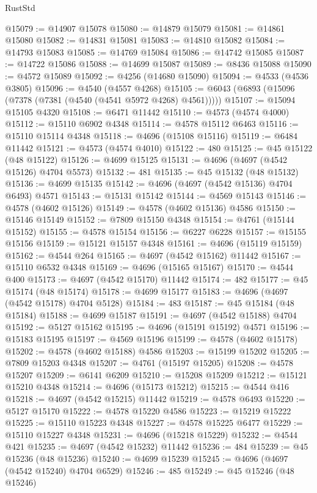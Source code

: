 \begin{lexlean}{RustStd}
\begin{coremodule}
@15079 := @14907 @15078
@15080 := @14879 @15079
@15081 := @14861 @15080
@15082 := @14831 @15081
@15083 := @14810 @15082
@15084 := @14793 @15083
@15085 := @14769 @15084
@15086 := @14742 @15085
@15087 := @14722 @15086
@15088 := @14699 @15087
@15089 := @8436 @15088
@15090 := @4572 @15089
@15092 := @4256 (@14680 @15090)
@15094 := @4533 (@4536 @3805)
@15096 := @4540 (@4557 @4268)
@15105 := @6043 (@6893 (@15096 (@7378 (@7381 (@4540 (@4541 @5972 @4268) @4561)))))
@15107 := @15094 @15105 @4320
@15108 := @6471 @11442
@15110 := @4573 (@4574 @4000)
@15112 := @15110 @6902 @4348
@15114 := @4578 @15112 @6463
@15116 := @15110 @15114 @4348
@15118 := @4696 (@15108 @15116)
@15119 := @6484 @11442
@15121 := @4573 (@4574 @4010)
@15122 := 480
@15125 := @45 @15122 (@48 @15122)
@15126 := @4699 @15125
@15131 := @4696 (@4697 (@4542 @15126) @4704 @5573)
@15132 := 481
@15135 := @45 @15132 (@48 @15132)
@15136 := @4699 @15135
@15142 := @4696 (@4697 (@4542 @15136) @4704 @6493) @4571
@15143 := @15131 @15142
@15144 := @4569 @15143
@15146 := @4578 (@4602 @15126)
@15149 := @4578 (@4602 @15136) @4586
@15150 := @15146 @15149
@15152 := @7809 @15150 @4348
@15154 := @4761 (@15144 @15152)
@15155 := @4578 @15154
@15156 := @6227 @6228
@15157 := @15155 @15156
@15159 := @15121 @15157 @4348
@15161 := @4696 (@15119 @15159)
@15162 := @4544 @264
@15165 := @4697 (@4542 @15162) @11442
@15167 := @15110 @6532 @4348
@15169 := @4696 (@15165 @15167)
@15170 := @4544 @400
@15173 := @4697 (@4542 @15170) @11442
@15174 := 482
@15177 := @45 @15174 (@48 @15174)
@15178 := @4699 @15177
@15183 := @4696 (@4697 (@4542 @15178) @4704 @5128)
@15184 := 483
@15187 := @45 @15184 (@48 @15184)
@15188 := @4699 @15187
@15191 := @4697 (@4542 @15188) @4704
@15192 := @5127 @15162
@15195 := @4696 (@15191 @15192) @4571
@15196 := @15183 @15195
@15197 := @4569 @15196
@15199 := @4578 (@4602 @15178)
@15202 := @4578 (@4602 @15188) @4586
@15203 := @15199 @15202
@15205 := @7809 @15203 @4348
@15207 := @4761 (@15197 @15205)
@15208 := @4578 @15207
@15209 := @6141 @6209
@15210 := @15208 @15209
@15212 := @15121 @15210 @4348
@15214 := @4696 (@15173 @15212)
@15215 := @4544 @416
@15218 := @4697 (@4542 @15215) @11442
@15219 := @4578 @6493
@15220 := @5127 @15170
@15222 := @4578 @15220 @4586
@15223 := @15219 @15222
@15225 := @15110 @15223 @4348
@15227 := @4578 @15225 @6477
@15229 := @15110 @15227 @4348
@15231 := @4696 (@15218 @15229)
@15232 := @4544 @421
@15235 := @4697 (@4542 @15232) @11442
@15236 := 484
@15239 := @45 @15236 (@48 @15236)
@15240 := @4699 @15239
@15245 := @4696 (@4697 (@4542 @15240) @4704 @6529)
@15246 := 485
@15249 := @45 @15246 (@48 @15246)

\end{coremodule}
\end{lexlean}
